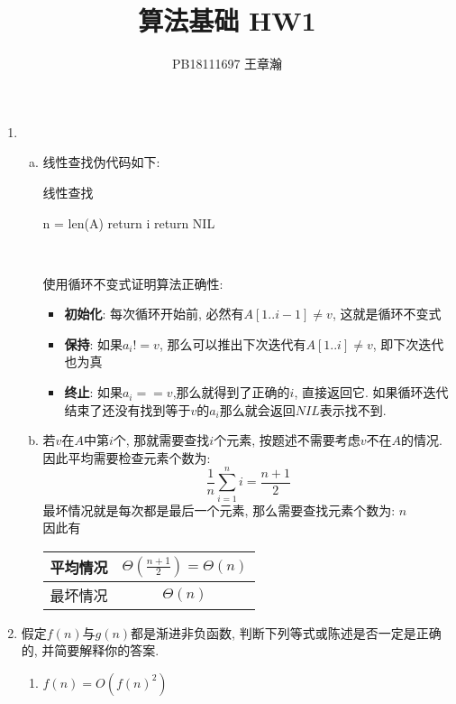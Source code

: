 \documentclass[UTF8]{article}
\title{算法基础 HW1}
\author{PB18111697 王章瀚}
\newcommand{\jumpLine} {\hspace*{\fill} \par}
\begin{document}
\maketitle
\begin{enumerate}[1.]
\item 
	\begin{enumerate}[(a).]
	\item 线性查找伪代码如下:\\
		\begin{minipage}{0.5\linewidth}
			\begin{algorithm}[H]
			\caption{线性查找} 
				\begin{algorithmic}[1]
					\State n = len(A)
							\State return i
						\EndIf
					\EndFor
					\State return NIL
				\EndFunction
				\end{algorithmic} 
			\end{algorithm}
		\end{minipage}\\
		\jumpLine
		使用循环不变式证明算法正确性:
		\begin{itemize}
		\item \textbf{初始化}: 每次循环开始前, 必然有$A[1..i-1]\not=v$, 这就是循环不变式
		\item \textbf{保持}: 如果$a_i!=v$, 那么可以推出下次迭代有$A[1..i]\not=v$, 即下次迭代也为真
		\item \textbf{终止}: 如果$a_i==v$,那么就得到了正确的$i$, 直接返回它. 如果循环迭代结束了还没有找到等于$v$的$a_i$那么就会返回$NIL$表示找不到.
		\end{itemize}
	\item 若$v$在$A$中第$i$个, 那就需要查找$i$个元素, 按题述不需要考虑$v$不在$A$的情况. 因此平均需要检查元素个数为:$$\frac{1}{n}\sum\limits_{i=1}^{n}i=\frac{n+1}{2}$$
	最坏情况就是每次都是最后一个元素, 那么需要查找元素个数为: $n$\\
	因此有
	\begin{tabular}{|c|c|}
	\hline
	平均情况 & $\Theta(\frac{n+1}{2})=\Theta(n)$ \\
	\hline
	最坏情况 & $\Theta(n)$ \\
	\hline
	\end{tabular}
	\end{enumerate}
	\jumpLine
\item 假定$f(n)$与$g(n)$都是渐进非负函数, 判断下列等式或陈述是否一定是正确的, 并简要解释你的答案.
	\begin{enumerate}[a ]
	\item $f(n)=O(f(n)^2)$

\end{enumerate}
\end{enumerate}
\end{document}
